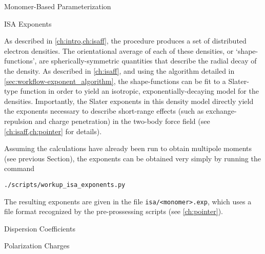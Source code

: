 \begin{section}{Monomer-Based Parameterization}
\begin{subsection}{ISA Exponents}

As described in \cref{ch:intro,ch:isaff}, the \isa procedure
produces a set of distributed \aim electron densities. The
orientational average of each of these \aim densities, or
`shape-functions', are spherically-symmetric quantities that describe the
radial decay of the \aim density.\cite{Misquitta2014} As described in
\cref{ch:isaff}, and using the algorithm detailed in 
\cref{sec:workflow-exponent_algorithm},
the shape-functions can be fit to a Slater-type function in
order to yield an isotropic, exponentially-decaying model for the \isa
densities. Importantly, the Slater exponents in this density model directly
yield the exponents necessary to describe short-range effects (such as
exchange-repulsion and charge penetration) in the two-body force
field (see \cref{ch:isaff,ch:pointer} for details).

Assuming the \isa calculations have already been run to obtain multipole
moments (see previous Section), the \isa exponents can be obtained very simply
by running the command
%
\begin{lstlisting}
./scripts/workup_isa_exponents.py
\end{lstlisting}
%
The resulting exponents are given in the file \verb|isa/<monomer>.exp|, which
uses a file format recognized by the \pointer pre-prossessing scripts (see
\cref{ch:pointer}).

\end{subsection}


\begin{subsection}{Dispersion Coefficients}
\label{sec:workflow-dispersion}



\end{subsection}

\begin{subsection}{Polarization Charges}
\label{sec:workflow-polarizabilities}



\end{subsection}

\end{section}
